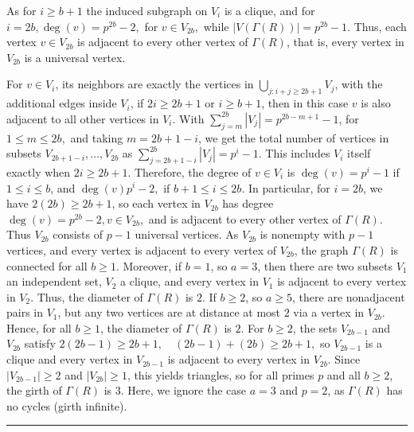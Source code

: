 \documentclass[12pt,twoside]{article}
\renewenvironment{proof}{{\noindent\bfseries Proof.}}{\qed}
\def\qed{\nolinebreak\hfill\rule{.2cm}{.2cm}\par\addvspace{.5cm}}
\begin{document}
\begin{proof}
		As for $i\ge b+1$ the induced subgraph on $V_i$ is a clique,	and for $i=2b, \deg(v) = p^{ 2b} - 2,  $ for $ v\in V_{2b},$	while $|V( \varGamma(R))| = p^{ 2b} - 1$. Thus, each vertex $v\in V_{2b}$ is adjacent to every
		other vertex of $ \varGamma(R)$, that is, every vertex in $V_{2b}$ is a universal vertex. 
		
		
		
		
		For $v\in V_i$, its neighbors are exactly the vertices in $\bigcup_{j: i+j\ge 2b+1} V_j$,
		with the additional edges inside $V_{i}$, if $2i\ge 2b+1$ or  $i\ge b+1$, then in this case $v$ is also adjacent
		to all other vertices in $V_i$. With $\sum_{j=m}^{2b} |V_j| = p^{ 2b-m+1}-1 $,  for $1\le m\le 2b,$	and taking $m=2b+1-i$, we get the total number of vertices in subsets $V_{2b+1-i},\dots,V_{2b}$ as $\sum_{j=2b+1-i}^{2b} |V_j|= p^{ i}-1.$
		This includes $V_i$ itself exactly when $2i\ge 2b+1$.	Therefore, the degree of $v\in V_{i}$ is $\deg(v)=p^{ i}-1$ if  $1\le i\le b$, and $\deg(v)p^{ i}-2,$  if $b+1\le i\le 2b$. In particular, for $i=2b$, we have $2(2b)\ge 2b+1$, so each vertex in
		$V_{2b}$ has degree $\deg(v) = p^{ 2b} - 2, v\in V_{2b},$ and is adjacent to every other vertex of $ \varGamma(R)$.
		Thus $V_{2b}$ consists of $p-1$ universal vertices. As $V_{2b}$ is nonempty with $p-1$ vertices, and every vertex is adjacent
			to every vertex of $V_{2b}$, the graph $ \varGamma(R)$ is connected for all $b\ge 1$. 
			Moreover, if $b=1$, so $a=3$, then there are two subsets $V_1$ an independent set, $V_2$ a clique, and every vertex in $V_1$ is adjacent to every vertex in $V_2$. Thus, the diameter of $ \varGamma(R)$	is $2$. If $b\ge 2$, so $a\ge 5$, there are nonadjacent pairs in $V_1$, but any two vertices are at distance at most $2$ via a vertex in $V_{2b}$. Hence, for all $b\ge 1$, the diameter of $ \varGamma(R)$ is $2$. For $b\ge 2$, the sets $V_{2b-1}$ and $V_{2b}$ satisfy $2(2b-1)\ge 2b+1,\quad (2b-1)+(2b)\ge 2b+1,$		so $V_{2b-1}$ is a clique and every vertex in $V_{2b-1}$ is adjacent to every vertex in $V_{2b}$. Since $|V_{2b-1}|\ge 2$ and $|V_{2b}|\ge 1$, this yields triangles, so for all primes $p$ and all $b\ge 2$, the girth of $ \varGamma(R)$ is $3$. Here, we ignore the case $a=3$ and $p=2$,  as $ \varGamma(R)$ has no cycles (girth infinite).
\end{proof}
\end{document}
